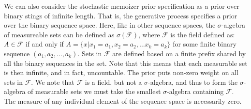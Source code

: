 \documentclass[11pt]{amsart}
\begin{document}
We can also consider the stochastic memoizer prior specification as a prior over binary stings of infinite length.  That is, the generative process specifies a prior over the binary sequence space.  Here, like in other sequence spaces, the $\sigma$-algebra of measureable sets can be defined as $\sigma(\mathcal{F})$, where $\mathcal{F}$ is the field defined as: $A \in \mathcal{F}$ if and only if $A = \{ x | x_1 = a_1, x_2 = a_2, \dots x_k = a_k \}$ for some finite binary sequence $(a_1, a_2, \dots, a_k)$.  Sets in $\mathcal{F}$ are defined based on a finite prefix shared by all the binary sequences in the set.  Note that this means that each measurable set is then infinite, and in fact, uncountable. The prior puts non-zero weight on all sets in $\mathcal{F}$.  We note that $\mathcal{F}$ is a field, but not a $\sigma$-algebra, and thus to form the $\sigma$-algebra of measurable sets we must take the smallest $\sigma$-algebra containing $\mathcal{F}$. The measure of any individual element of the sequence space is necessarily zero.
\end{document}
